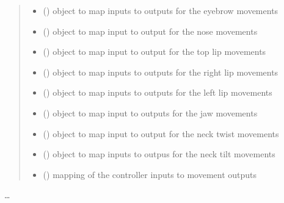 \documentclass[letterpaper,10pt,english]{sphinxmanual}
\begin{document}
\begin{fulllineitems}
\begin{quote}
\begin{description}
\begin{itemize}
\item {} 
\sphinxAtStartPar
{}() \textendash{} object to map inputs to outputs for the eyebrow movements

\item {} 
\sphinxAtStartPar
{}() \textendash{} object to map input to output for the nose movements

\item {} 
\sphinxAtStartPar
{}() \textendash{} object to map input to output for the top lip movements

\item {} 
\sphinxAtStartPar
{}() \textendash{} object to map inputs to outputs for the right lip movements

\item {} 
\sphinxAtStartPar
{}() \textendash{} object to map inputs to outputs for the left lip movements

\item {} 
\sphinxAtStartPar
{}() \textendash{} object to map input to outputs for the jaw movements

\item {} 
\sphinxAtStartPar
{}() \textendash{} object to map input to output for the neck twist movements

\item {} 
\sphinxAtStartPar
{}() \textendash{} object to map inputs to outpus for the neck tilt movements

\item {} 
\sphinxAtStartPar
{}() \textendash{} mapping of the controller inputs to movement outputs

\end{itemize}

\end{description}\end{quote}

\sphinxAtStartPar
…

\sphinxAtStartPar
{}


\end{fulllineitems}
\end{document}
